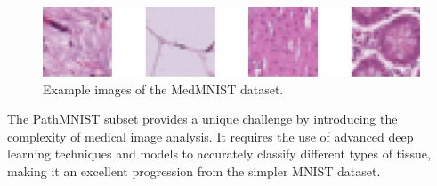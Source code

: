 \begin{figure}[ht]
    \centering
    \includegraphics[width=.8\textwidth]{figures/MedMNIST.png}
    \caption{Example images of the MedMNIST dataset.}\label{fig:MedMNIST}
\end{figure}


The PathMNIST subset provides a unique challenge by introducing the complexity of medical image analysis. It requires the use of advanced deep learning techniques and models to accurately classify different types of tissue, making it an excellent progression from the simpler MNIST dataset.

